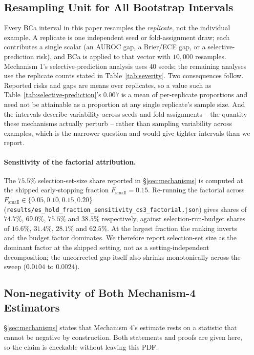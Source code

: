 \documentclass{article}
\begin{document}
\subsection{Resampling Unit for All Bootstrap Intervals}
\label{app:resampling}
Every BCa interval in this paper resamples the \emph{replicate}, not the
individual example. A replicate is one independent seed or fold-assignment
draw; each contributes a single scalar (an AUROC gap, a Brier/ECE gap, or a
selective-prediction risk), and BCa is applied to that vector with
$10{,}000$ resamples. Mechanism 1's selective-prediction analysis uses 40
seeds; the remaining analyses use the replicate counts stated in
Table~\ref{tab:severity}. Two consequences follow. Reported risks and gaps
are means over replicates, so a value such as
Table~\ref{tab:selective-prediction}'s $0.007$ is a mean of per-replicate
proportions and need not be attainable as a proportion at any single
replicate's sample size. And the intervals describe variability across
seeds and fold assignments -- the quantity these mechanisms actually
perturb -- rather than sampling variability across examples, which is the
narrower question and would give tighter intervals than we report.

\paragraph{Sensitivity of the factorial attribution.} The $75.5\%$
selection-set-size share reported in \S\ref{sec:mechanisms} is computed at
the shipped early-stopping fraction $F_{\text{small}}{=}0.15$. Re-running the
factorial across $F_{\text{small}}\in\{0.05,0.10,0.15,0.20\}$
(\texttt{results/es\_hold\_fraction\_sensitivity\_cs3\_factorial.json}) gives
shares of $74.7\%$, $69.0\%$, $75.5\%$ and $38.5\%$ respectively, against
selection-run-budget shares of $16.6\%$, $31.4\%$, $28.1\%$ and $62.5\%$. At
the largest fraction the ranking inverts and the budget factor dominates. We
therefore report selection-set size as the dominant factor at the shipped
setting, not as a setting-independent decomposition; the uncorrected gap
itself also shrinks monotonically across the sweep ($0.0104$ to $0.0024$).

\subsection{Non-negativity of Both Mechanism-4 Estimators}
\label{app:nonneg}

\S\ref{sec:mechanisms} states that Mechanism 4's estimate rests on a statistic
that cannot be negative by construction. Both statements and proofs are given
here, so the claim is checkable without leaving this PDF.
\end{document}
